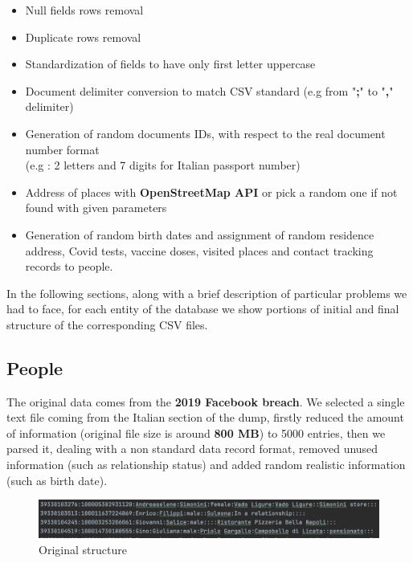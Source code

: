 \documentclass{article}[IEEEtran]
\begin{document}
\begin{itemize}
    \item Null fields rows removal
    \item Duplicate rows removal
    \item Standardization of fields to have only first letter uppercase
    \item Document delimiter conversion to match CSV standard (e.g from "\textbf{;}" to "\textbf{,}" delimiter)
    \item Generation of random documents IDs, with respect to the real document number format \\ (e.g : 2 letters and 7 digits for Italian passport number)
    \item  Address of places with \textbf{OpenStreetMap API}\cite{OpenStreetMap} or pick a random one if not found with given parameters
    \item Generation of random birth dates and assignment of random residence address, Covid tests, vaccine doses, visited places and contact tracking records to people.
\end{itemize}

In the following sections, along with a brief description of particular problems we had to face, for each entity of the database we show portions of initial and final structure of the corresponding CSV files.

\subsection{People}

The original data comes from the \textbf{2019 Facebook breach}\cite{facebookleak}. We selected a single text file coming from the Italian section of the dump, firstly reduced the amount of information (original file size is around \textbf{800 MB}) to 5000 entries, then we parsed it, dealing with a non standard data record format, removed unused information (such as relationship status) and added random realistic information (such as birth date).

\begin{figure}[H]
\begin{center}
\includegraphics[width=0.5\linewidth, frame]{people_original.png}
\caption{Original structure}
\end{center}
\end{figure}
\end{document}
